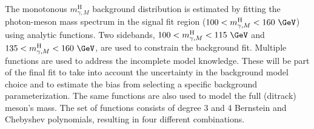 \newpage
The monotonous $m^{\text{H}}_{\gamma, M}$ background distribution is estimated by fitting the photon-meson mass spectrum in the signal fit region ($100 < m^{\text{H}}_{\gamma, M} < 160\ \GeV$) using analytic functions. Two sidebands, $100 < m^{\text{H}}_{\gamma, M} < 115\ \GeV$ and $135 < m^{\text{H}}_{\gamma, M} < 160\ \GeV$, are used to constrain the background fit. Multiple functions are used to address the incomplete model knowledge. These will be part of the final fit to take into account the uncertainty in the background model choice and to estimate the bias from selecting a specific background parameterization. The same functions are also used to model the full (ditrack) meson's mass. The set of functions consists of degree 3 and 4 Bernstein and Chebyshev polynomials, resulting in four different combinations. 

